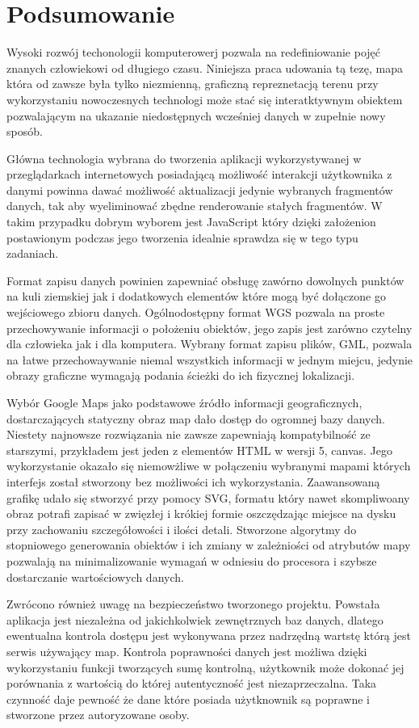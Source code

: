 \chapter{Podsumowanie}

Wysoki rozwój techonologii komputerowerj pozwala na redefiniowanie pojęć znanych człowiekowi od długiego czasu. Niniejsza praca udowania tą tezę, mapa która od zawsze była tylko niezmienną, graficzną repreznetacją terenu przy wykorzystaniu nowoczesnych technologi może stać się interatktywnym obiektem pozwalającym na ukazanie niedostępnych wcześniej danych w zupełnie nowy sposób.

Główna technologia wybrana do tworzenia aplikacji wykorzystywanej w przeglądarkach internetowych posiadającą możliwość interakcji użytkownika z danymi powinna dawać możliwość aktualizacji jedynie wybranych fragmentów danych, tak aby wyeliminować zbędne renderowanie stałych fragmentów. W takim przypadku dobrym wyborem jest JavaScript który dzięki założenion postawionym podczas jego tworzenia idealnie sprawdza się w tego typu zadaniach.

Format zapisu danych powinien zapewniać obsługę zawórno dowolnych punktów na kuli ziemskiej jak i dodatkowych elementów które mogą być dołączone go wejściowego zbioru danych. Ogólnodostępny format WGS pozwala na proste przechowywanie informacji o położeniu obiektów, jego zapis jest zarówno czytelny dla człowieka jak i dla komputera. Wybrany format zapisu plików, GML, pozwala na łatwe przechowaywanie niemal wszystkich informacji w jednym miejcu, jedynie obrazy graficzne wymagają podania ścieżki do ich fizycznej lokalizacji.

Wybór Google Maps jako podstawowe źródło informacji geograficznych, dostarczających statyczny obraz map dało dostęp do ogromnej bazy danych. Niestety najnowsze rozwiązania nie zawsze zapewniają kompatybilność ze starszymi, przykładem jest jeden z elementów HTML w wersji 5, canvas. Jego wykorzystanie okazało się niemowżliwe w połączeniu wybranymi mapami których interfejs został stworzony bez możliwości ich wykorzystania. Zaawansowaną grafikę udało się stworzyć przy pomocy SVG, formatu który nawet skompliwoany obraz potrafi zapisać w zwięzłej i krókiej formie oszczędzając miejsce na dysku przy zachowaniu szczegółowości i ilości detali. Stworzone algorytmy do stopniowego generowania obiektów i ich zmiany w zależniości od atrybutów mapy pozwalają na minimalizowanie wymagań w odniesiu do procesora i szybsze dostarczanie wartościowych danych.

Zwrócono również uwagę na bezpieczeństwo tworzonego projektu. Powstała aplikacja jest niezależna od jakichkolwiek zewnętrznych baz danych, dlatego ewentualna kontrola dostępu jest wykonywana przez nadrzędną wartstę którą jest serwis używający map. Kontrola poprawności danych jest możliwa dzięki wykorzystaniu funkcji tworzących sumę kontrolną, użytkownik może dokonać jej porównania z wartością do której autentyczność jest niezaprzeczalna. Taka czynność daje pewność że dane które posiada użytknownik są poprawne i stworzone przez autoryzowane osoby.

